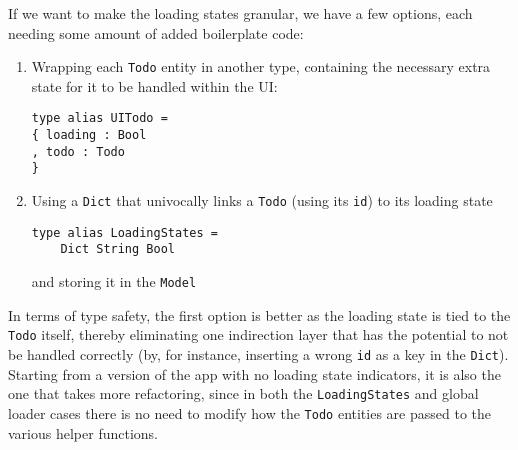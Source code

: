 If we want to make the loading states granular, we have a few options, each needing some amount of added boilerplate code:
\begin{enumerate}
    \item Wrapping each \texttt{Todo} entity in another type, containing the necessary extra state for it to be handled within the UI:
    \begin{verbatim}
type alias UITodo =
{ loading : Bool
, todo : Todo
}
    \end{verbatim}
    \item Using a \texttt{Dict} that univocally links a \texttt{Todo} (using its \texttt{id}) to its loading state
    \begin{verbatim}
type alias LoadingStates =
    Dict String Bool
    \end{verbatim}
    and storing it in the \texttt{Model}
\end{enumerate} 
In terms of type safety, the first option is better as the loading state is tied to the \texttt{Todo} itself, thereby eliminating one indirection layer that has the potential to not be handled correctly (by, for instance, inserting a wrong \texttt{id} as a key in the \texttt{Dict}).\\
Starting from a version of the app with no loading state indicators, it is also the one that takes more refactoring, since in both the \texttt{LoadingStates} and global loader cases there is no need to modify how the \texttt{Todo} entities are passed to the various helper functions.\\

